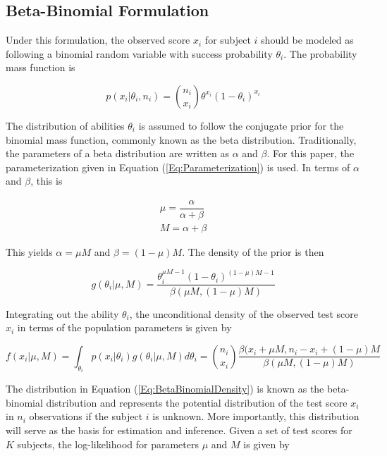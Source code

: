 \documentclass[12pt,epsfig]{article}
\begin{document}
\subsection{Beta-Binomial Formulation}
\label{Subsec:BetaBinomial}

Under this formulation, the observed score $x_i$ for subject $i$ should be modeled as following a binomial random variable with success probability $\theta_i$. The probability mass function is

\begin{equation*}
    p(x_i | \theta_i, n_i) = {n_i \choose x_i} \theta^{x_i} (1-\theta_i)^{x_i} 
\end{equation*}

The distribution of abilities $\theta_i$ is assumed to follow the conjugate prior for the binomial mass function, commonly known as the beta distribution. Traditionally, the parameters of a beta distribution are written as $\alpha$ and $\beta$. For this paper, the parameterization given in Equation (\ref{Eq:Parameterization}) is used. In terms of $\alpha$ and $\beta$, this is

\begin{align*}
    \mu = \dfrac{\alpha}{\alpha + \beta}\\
    M = \alpha + \beta
\end{align*}

\noindent This yields $\alpha = \mu M$ and $\beta = (1 - \mu) M$. The density of the prior is then 

\begin{equation*}
    g(\theta_i | \mu, M) = \dfrac{\theta_i^{\mu M -1} (1 - \theta_i)^{(1-\mu)M - 1}}{\beta(\mu M, (1 - \mu)M)}
\end{equation*}

Integrating out the ability $\theta_i$, the unconditional density of the observed test score $x_i$ in terms of the population parameters is given by

\begin{equation}
    f(x_i | \mu, M) = \displaystyle \int_{\theta_i} p(x_i | \theta_i) g(\theta_i | \mu, M) d\theta_i =  {n_i \choose x_i} \dfrac{\beta(x_i + \mu M, n_i - x_i + (1 - \mu)M}{\beta(\mu M, (1 - \mu)M)}
    \label{Eq:BetaBinomialDensity}
\end{equation}

\noindent The distribution in Equation (\ref{Eq:BetaBinomialDensity}) is known as the beta-binomial distribution and represents the potential distribution of the test score $x_i$ in $n_i$ observations if the subject $i$ is unknown. More importantly, this distribution will serve as the basis for estimation and inference. Given a set of test scores for $K$ subjects, the log-likelihood for parameters $\mu$ and $M$ is given by
\end{document}
